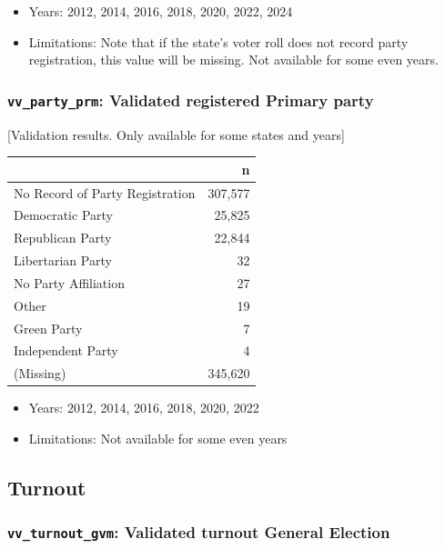 \documentclass[10pt,article,oneside]{memoir}
\begin{document}
\begin{itemize}
\tightlist
\item
  Years: 2012, 2014, 2016, 2018, 2020, 2022, 2024
\item
  Limitations: Note that if the state's voter roll does not record party
  registration, this value will be missing. Not available for some even
  years.
\end{itemize}

\subsubsection{\texorpdfstring{\texttt{vv\_party\_prm}: Validated
registered Primary
party}{vv\_party\_prm: Validated registered Primary party}}\label{vv_party_prm-validated-registered-primary-party}

{[}Validation results. Only available for some states and years{]}

\begin{table}[H]
\centering
\begin{tabular}[t]{lr}
\toprule
 & n\\
\midrule
No Record of Party Registration & 307,577\\
Democratic Party & 25,825\\
Republican Party & 22,844\\
Libertarian Party & 32\\
No Party Affiliation & 27\\
Other & 19\\
Green Party & 7\\
Independent Party & 4\\
(Missing) & 345,620\\
\bottomrule
\end{tabular}
\end{table}

\begin{itemize}
\tightlist
\item
  Years: 2012, 2014, 2016, 2018, 2020, 2022
\item
  Limitations: Not available for some even years
\end{itemize}

\subsection{Turnout}\label{turnout}

\subsubsection{\texorpdfstring{\texttt{vv\_turnout\_gvm}: Validated
turnout General
Election}{vv\_turnout\_gvm: Validated turnout General Election}}\label{vv_turnout_gvm-validated-turnout-general-election}
\end{document}
